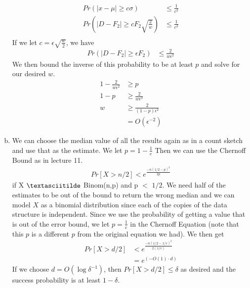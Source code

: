 \documentclass{article}
\theoremstyle{casestyle}
\begin{document}
\begin{enumerate}[a)]
\begin{align*}
  Pr \left(\left|x-\mu\right| \geq c\sigma \right) &\leq \frac{1}{c^2} \\
  Pr \left(\left|D-F_2\right| \geq cF_2\sqrt{\frac{2}{w}} \right) &\leq \frac{1}{c^2} \\
\end{align*} If we let $c=\epsilon\sqrt{\frac{w}{2}}$, we have 
\begin{align*}
  Pr \left(\left|D-F_2\right| \geq \epsilon F_2 \right) &\leq \frac{2}{w\epsilon^2}
\end{align*} We then bound the inverse of this probability to be at least $p$ and solve for our desired $w$.
\begin{align*}
  1 - \frac{2}{w\epsilon^2} &\geq p \\
  1 - p &\geq \frac{2}{w\epsilon^2} \\
  w &\geq \frac{2}{(1-p)\epsilon^2} \\
  &= O(\epsilon^{-2})
\end{align*}
\item We can choose the median value of all the results again as in a count sketch and use that as the estimate. We let $p=1-\frac{1}{e}$ Then we can use the Chernoff Bound as in lecture 11.
\begin{align*}
  Pr\left[ X > n/2 \right] < e^{\frac{-n(1/2-p)^2}{2p}}
\end{align*} if X $\textasciitilde$ Binom(n,p) and p $<$ $1/2$. We need half of the estimates to be out of the bound to return the wrong median and we can model $X$ as a binomial distribution since each of the copies of the data structure is independent. Since we use the probability of getting a value that is out of the error bound, we let $p=\frac{1}{e}$ in the Chernoff Equation (note that this $p$ is a different $p$ from the original equation we had). We then get
\begin{align*}
  Pr\left[ X > d/2 \right] &< e^{\frac{-n(1/2-1/e)^2}{2(1/e)}} \\
                           &= e^{(-O(1)\cdot d)}
\end{align*} If we choose $d=O(\log \delta ^{-1})$, then $Pr[X>d/2] \leq \delta$ as desired and the success probability is at least $1-\delta$.
\end{enumerate}
\end{document}
